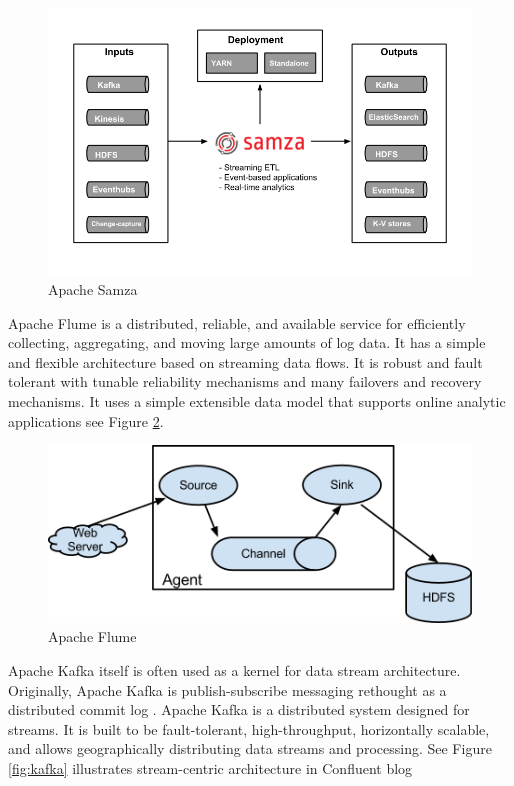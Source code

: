 \documentclass[twoside,12pt, a4paper]{report}
\begin{document}
\begin{figure}[!h]
	\centering
	\includegraphics[width=1\linewidth]{figures/samza-arch4.png}
	\caption{\cite{samza} Apache Samza}
	\label{fig:samza}
\end{figure}



Apache Flume \cite{flume} is a distributed, reliable, and available
service for efficiently collecting, aggregating, and moving
large amounts of log data. It has a simple and flexible
architecture based on streaming data flows. It is robust and
fault tolerant with tunable reliability mechanisms and many
failovers and recovery mechanisms. It uses a simple
extensible data model that supports online analytic
applications see Figure \ref{fig:flume}.

\begin{figure}[!h]
	\centering
	\includegraphics[width=1\linewidth]{figures/DevGuide_image00.png}
	\caption{\cite{flume} Apache Flume}
	\label{fig:flume}
\end{figure}


Apache Kafka itself is often used as a kernel for data stream
architecture. Originally, Apache Kafka is publish-subscribe
messaging rethought as a distributed commit log \cite{ApacheKA}.
Apache Kafka is a distributed system designed for streams.
It is built to be fault-tolerant, high-throughput, horizontally
scalable, and allows geographically distributing data streams
and processing. See Figure \ref{fig:kafka} illustrates stream-centric
architecture in Confluent blog  \cite{Kafka}
\end{document}
